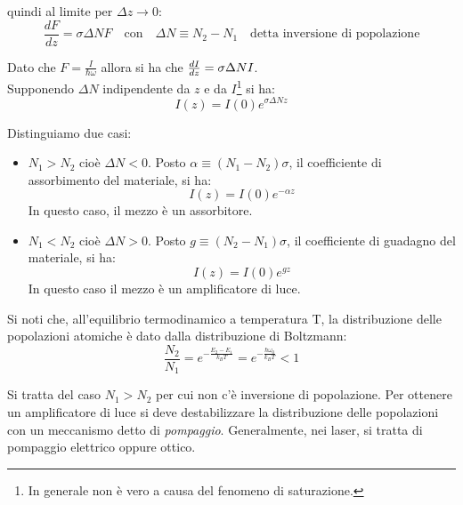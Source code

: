 quindi al limite per $\Delta z \rightarrow 0$:
\begin{equation*}
    \frac{dF}{dz} = \sigma \Delta N F \quad \text{con} \quad \Delta N \equiv N_2 - N_1 \quad \text{detta inversione di popolazione}
\end{equation*}

Dato che $F = \frac{I}{\hbar \omega}$ allora si ha che $\frac{dI}{dz} = \sigma \Delta N I$.\\
Supponendo $\Delta N$ indipendente da $z$ e da $I$\footnote{In generale non è vero a causa del fenomeno di saturazione.} si ha:
\begin{equation*}
    I(z) = I(0) e^{\sigma \Delta N z}
\end{equation*}

Distinguiamo due casi:

\begin{itemize}
    \item $N_1 > N_2$ cioè $\Delta N < 0$. Posto $\alpha \equiv (N_1 - N_2) \sigma$, il coefficiente di assorbimento del materiale, si ha:
    \begin{equation*}
        I(z) = I(0) e^{-\alpha z}
    \end{equation*}
    In questo caso, il mezzo è un assorbitore.
    \item $N_1 < N_2$ cioè $\Delta N > 0$. Posto $g \equiv (N_2 - N_1) \sigma$, il coefficiente di guadagno del materiale, si ha:
    \begin{equation*}
        I(z) = I(0) e^{g z}
    \end{equation*}
    In questo caso il mezzo è un amplificatore di luce.
\end{itemize}

Si noti che, all'equilibrio termodinamico a temperatura T, la distribuzione delle popolazioni atomiche è dato dalla distribuzione di Boltzmann:
\begin{equation*}
    \frac{N_2}{N_1} = e^{-\frac{E_2 - E_1}{k_B T}} = e^{-\frac{\hbar \omega_0}{k_B T}} < 1
\end{equation*}

Si tratta del caso $N_1 > N_2$ per cui non c'è inversione di popolazione. Per ottenere un amplificatore di luce si deve destabilizzare la distribuzione delle popolazioni con un meccanismo detto di \textit{pompaggio}. Generalmente, nei laser, si tratta di pompaggio elettrico oppure ottico.

